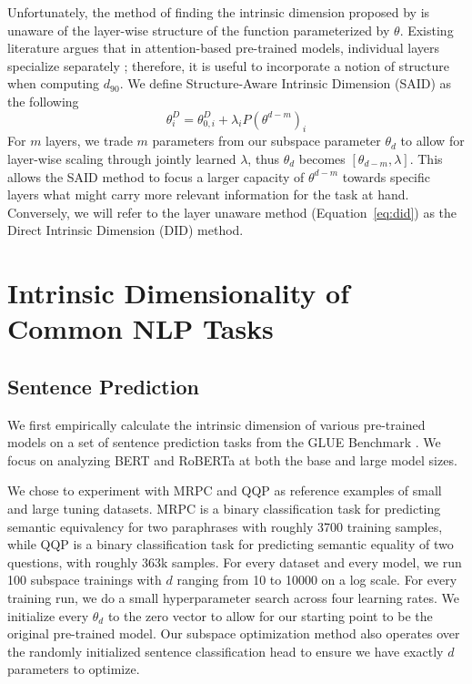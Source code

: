 \documentclass{article} %
\begin{document}
Unfortunately, the method of finding the intrinsic dimension proposed by \cite{intrinsic_dimension} is unaware of the layer-wise structure of the function parameterized by $\theta$. Existing literature argues that in attention-based pre-trained models, individual layers specialize separately \citep{what_does_bert_look_at}; therefore, it is useful to incorporate a notion of structure when computing $d_{90}$. 
We define Structure-Aware Intrinsic Dimension (SAID) as the following
\begin{equation}
    \theta^{D}_i = \theta^{D}_{0, i} + \lambda_i P(\theta^{d-m})_i
\end{equation}
For $m$ layers, we trade $m$ parameters from our subspace parameter $\theta_d$ to allow for layer-wise scaling through jointly learned $\lambda$, thus $\theta_d$ becomes $\left[\theta_{d-m}, \lambda\right]$. This allows the SAID method to focus a larger capacity of $\theta^{d-m}$ towards specific layers what might carry more relevant information for the task at hand. Conversely, we will refer to the layer unaware method (Equation~\ref{eq:did}) as the Direct Intrinsic Dimension (DID) method.
\section{Intrinsic Dimensionality of Common NLP Tasks}
\label{sec:mes}

\subsection{Sentence Prediction}
We first empirically calculate the intrinsic dimension of various pre-trained models on a set of sentence prediction tasks from the GLUE Benchmark \citep{GLUE}. We focus on analyzing BERT \citep{BERT} and RoBERTa \citep{ROBERTA} at both the base and large model sizes.

We chose to experiment with MRPC \citep{mrpc} and QQP \citep{qqp} as reference examples of small and large tuning datasets. MRPC is a binary classification task for predicting semantic equivalency for two paraphrases with roughly 3700 training samples, while QQP is a binary classification task for predicting semantic equality of two questions, with roughly 363k samples. For every dataset and every model, we run 100 subspace trainings with $d$ ranging from 10 to 10000 on a log scale. For every training run, we do a small hyperparameter search across four learning rates. We initialize every $\theta_d$ to the zero vector to allow for our starting point to be the original pre-trained model. Our subspace optimization method also operates over the randomly initialized sentence classification head to ensure we have exactly $d$ parameters to optimize.
\end{document}
